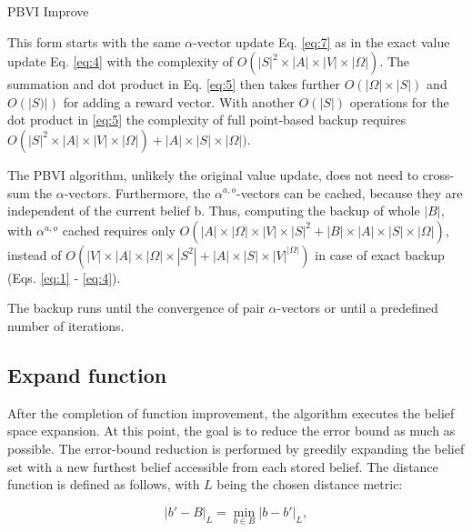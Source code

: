 \LinesNumbered
\begin{algorithm}[H]
\SetAlgoLined
{}
\caption{PBVI Improve}
\end{algorithm}


This form starts with the same $\alpha$-vector update Eq. \ref{eq:7} as in the exact value update Eq. \ref{eq:4} with the complexity of $O(|S|^2 \times |A| \times |V| \times |\Omega|)$. The summation and dot product in Eq. \ref{eq:5} then takes further $O(|\Omega| \times |S|)$ and $O(|S)|)$ for adding a reward vector. With another $O(|S|)$ operations for the dot product in \ref{eq:5} the complexity of full point-based backup requires $O(|S|^2 \times |A| \times |V| \times |\Omega|) + |A| \times |S| \times |\Omega|)$.

The PBVI algorithm, unlikely the original value update, does not need to cross-sum the $\alpha$-vectors. Furthermore, the $\alpha^{a, o}$-vectors can be cached, because they are independent of the current belief b. Thus, computing the backup of whole $|B|$, with $\alpha^{a, o}$ cached requires only $O(|A| \times |\Omega| \times |V| \times |S|^2 +
|B|\times|A|\times|S|\times|\Omega|)$, instead of $O(|V| \times |A| \times |\Omega| \times |S^2| + |A| \times |S| \times |V|^{|\Omega|})$ in case of exact backup (Eqs. \ref{eq:1} - \ref{eq:4}).


The backup runs until the convergence of pair $\alpha$-vectors or until a predefined number of iterations.

\subsection{Expand function}

After the completion of function improvement, the algorithm executes the belief space expansion. At this point, the goal is to reduce the error bound as much as possible. The error-bound reduction is performed by greedily expanding the belief set with a new furthest belief accessible from each stored belief. The distance function is defined as follows, with $L$ being the chosen distance metric:

\begin{equation}|b' - B|_L = \operatorname*{min}_{b \in B} |b - b'|_L,\end{equation}


